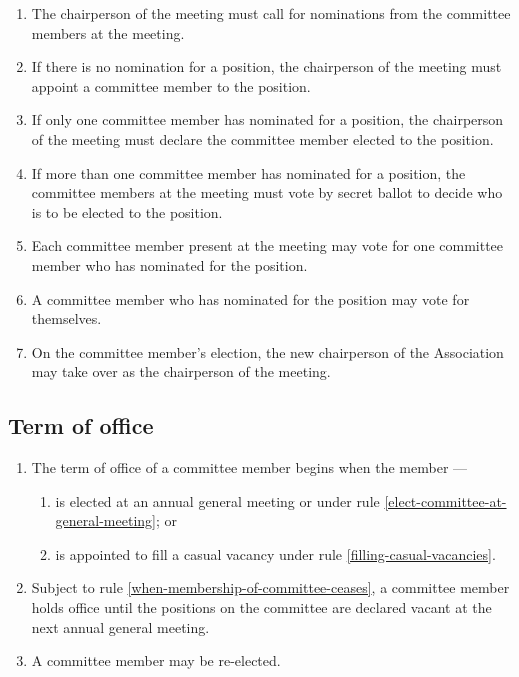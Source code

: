 \documentclass[../constitution.tex]{subfiles}
\begin{document}
\begin{enumerate}
        \begin{enumerate}
          \item The chairperson of the meeting must call for nominations from the committee members at the meeting.
          \item If there is no nomination for a position, the chairperson of the meeting must appoint a committee member to the position.
          \item If only one committee member has nominated for a position, the chairperson of the meeting must declare the committee member elected to the position.
          \item If more than one committee member has nominated for a position, the committee members at the meeting must vote by secret ballot to decide who is to be elected to the position.
          \item Each committee member present at the meeting may vote for one committee member who has nominated for the position.
          \item A committee member who has nominated for the position may vote for themselves.
          \item On the committee member's election, the new chairperson of the Association may take over as the chairperson of the meeting.
        \end{enumerate}

\end{enumerate}

\hypertarget{term-of-office}{%
  \subsection{Term of office}\label{term-of-office}}

\begin{enumerate}

  \item The term of office of a committee member begins when the member ---

        \begin{enumerate}

          \item is elected at an annual general meeting or under rule \ref{elect-committee-at-general-meeting}; or
          \item is appointed to fill a casual vacancy under rule \ref{filling-casual-vacancies}.
        \end{enumerate}
  \item Subject to rule \ref{when-membership-of-committee-ceases}, a committee member holds office until the positions on the committee are declared vacant at the next annual general meeting.
  \item A committee member may be re-elected.
\end{enumerate}
\end{document}
